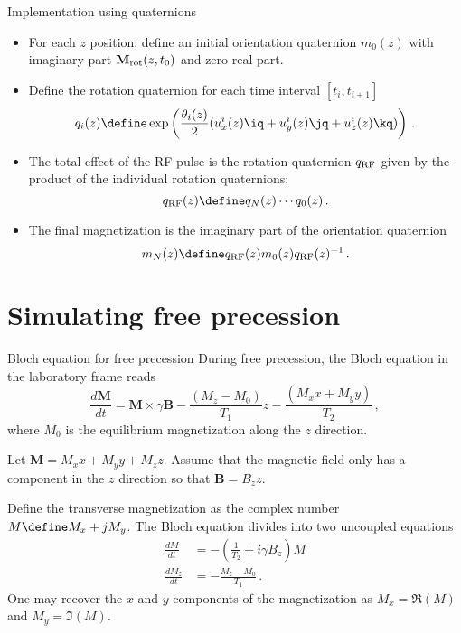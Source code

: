 \documentclass{beamer}
\begin{document}
\begin{frame}{Implementation using quaternions}
\begin{itemize}
\item For each $z$ position, define an initial orientation quaternion $m_0(z)$ with imaginary part $\mathbf{M}_{\rm rot}(z,t_0)$ and zero real part.
\item Define the rotation quaternion for each time interval $[t_i,t_{i+1}]$
\begin{equation*}
q_i(z) \define \exp\left(\frac{\theta_i(z)}{2}(u^i_x(z)\iq+u^i_y(z)\jq+u^i_z(z)\kq)\right)\,.
\end{equation*}
\item The total effect of the RF pulse is the rotation quaternion $q_{\rm RF}$ given by the product of the individual rotation quaternions:
\begin{equation*}
q_{\rm RF}(z) \define q_N(z) \cdots q_0(z)\,.
\end{equation*}
\item The final magnetization is the imaginary part of the orientation quaternion
\begin{equation*}
m_N(z) \define q_{\rm RF}(z) m_0(z) q_{\rm RF}(z)^{-1}\,.
\end{equation*}
\end{itemize}
\end{frame}

\section{Simulating free precession}

\begin{frame}{Bloch equation for free precession}
During free precession, the Bloch equation in the laboratory frame reads
\begin{equation*}
\frac{d\mathbf{M}}{dt} = \mathbf{M} \times \gamma \mathbf{B} - \frac{(M_z-M_0)}{T_1}\unit{z} - \frac{(M_x\unit{x}+M_y\unit{y})}{T_2}\,,
\end{equation*}
where $M_0$ is the equilibrium magnetization along the $z$ direction.

Let $\mathbf{M} = M_x\unit{x}+M_y\unit{y}+M_z\unit{z}$. Assume that the magnetic field only has a component in the $z$ direction so that $\mathbf{B} = B_z\unit{z}$.
\end{frame}

\begin{frame}
Define the transverse magnetization as the complex number $M \define M_x+jM_y$. The Bloch equation divides into two uncoupled equations
\begin{equation*}
\begin{aligned}
\frac{dM}{dt} &= -\left(\frac{1}{T_2}+i \gamma B_z\right)M\\
\frac{dM_z}{dt} &= -\frac{M_z-M_0}{T_1}\,.
\end{aligned}
\end{equation*}
One may recover the $x$ and $y$ components of the magnetization as $M_x = \Re(M)$ and $M_y = \Im(M)$.
\end{frame}
\end{document}
